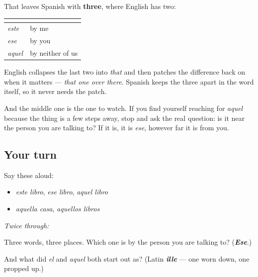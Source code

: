 \begin{culture}
That leaves Spanish with \textbf{three}, where English has two:

\noindent
\begin{tabularx}{\linewidth}{@{}>{\raggedright\arraybackslash}X>{\raggedright\arraybackslash}X@{}}
\toprule
\textbf{} & \textbf{} \\
\midrule
\emph{este} & by me \\
\emph{ese} & by you \\
\emph{aquel} & by neither of us \\
\bottomrule
\end{tabularx}

English collapses the last two into \emph{that} and then patches the difference back on when it matters — \emph{that one over there}. Spanish keeps the three apart in the word itself, so it never needs the patch.

And the middle one is the one to watch. If you find yourself reaching for \emph{aquel} because the thing is a few steps away, stop and ask the real question: is it near the person you are talking to? If it is, it is \emph{ese}, however far it is from you.
\end{culture}

\subsection*{Your turn}
Say these aloud:

\begin{itemize}
\raggedright
  \item \emph{este libro}, \emph{ese libro}, \emph{aquel libro}
  \item \emph{aquella casa}, \emph{aquellos libros}
\end{itemize}

\emph{Twice through:}

\begin{tcolorbox}[breakable,colback=teal!4,colframe=teal!35!black,title={Before you move on}]
Three words, three places. Which one is by the person you are talking to? (\emph{\textbf{Ese}}.)

And what did \emph{el} and \emph{aquel} both start out as? (Latin \emph{\textbf{ille}} — one worn down, one propped up.)
\end{tcolorbox}
